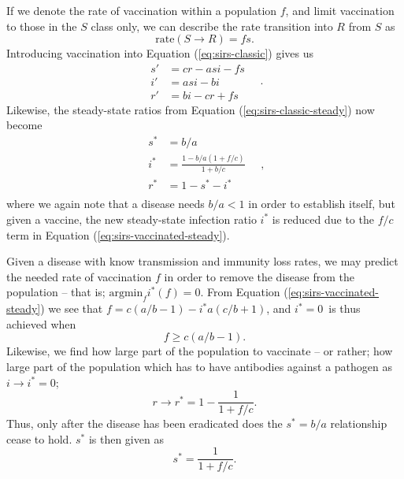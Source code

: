 \documentclass[]{article}
\begin{document}
If we denote the rate of vaccination within a population $f$, and limit vaccination to those in the $S$ class only, we can describe the rate transition into $R$ from $S$ as
\begin{equation}
	\mathrm{rate}(S \rightarrow R) = fs.
\end{equation}
Introducing vaccination into Equation (\ref{eq:sirs-classic}) gives us
\begin{equation} \label{eq:sirs-vaccinated}
\begin{aligned}
	s' &= cr - asi - fs \\
	i' &= asi - bi \\
	r' &= bi - cr + fs
\end{aligned} \quad .
\end{equation}
Likewise, the steady-state ratios from Equation (\ref{eq:sirs-classic-steady}) now become
\begin{equation} \label{eq:sirs-vaccinated-steady}
\begin{aligned}
	s^* &= b/a \\
	i^* &= \frac{1 - b/a(1 + f/c)}{1 + b/c} \\
	r^* &= 1 - s^* - i^* \\
\end{aligned} \quad ,
\end{equation}
where we again note that a disease needs $b/a < 1$ in order to establish itself, but given a vaccine, the new steady-state infection ratio $i^*$ is reduced due to the $f/c$ term in Equation (\ref{eq:sirs-vaccinated-steady}).

Given a disease with know transmission and immunity loss rates, we may predict the needed rate of vaccination $f$ in order to remove the disease from the population -- that is; $\mathrm{argmin}_{f} i^*(f) = 0$. From Equation (\ref{eq:sirs-vaccinated-steady}) we see that $f = c(a/b - 1) - i^*a(c/b + 1)$, and $i^* = 0$ is thus achieved when
\begin{equation} \label{eq:vaccination-rate-min}
	f \ge c(a/b - 1).
\end{equation}
Likewise, we find how large part of the population to vaccinate -- or rather; how large part of the population which has to have antibodies against a pathogen as $i \rightarrow i^* = 0$;
\begin{equation} \label{eq:vaccination-fraction}
	r \rightarrow r^* = 1 - \frac{1}{1 + f/c}.
\end{equation}
Thus, only after the disease has been eradicated does the $s^* = b/a$ relationship cease to hold. $s^*$ is then given as
\begin{equation}
	s^* = \frac{1}{1 + f/c}.
\end{equation}
\end{document}
